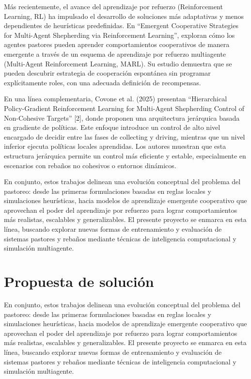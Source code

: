 \documentclass[final]{article}
\begin{document}
Más recientemente, el avance del aprendizaje por refuerzo (Reinforcement Learning, RL) ha impulsado el desarrollo de soluciones más adaptativas y menos
dependientes de heurísticas predefinidas. En “Emergent Cooperative Strategies for Multi-Agent Shepherding via Reinforcement Learning”, \citet{NapolitanoShepherding} exploran cómo los agentes pastores pueden aprender comportamientos cooperativos de manera emergente a través de un esquema de aprendizaje por refuerzo multiagente (Multi-Agent Reinforcement Learning, MARL). Su estudio demuestra que se pueden descubrir estrategia de cooperación espontánea sin programar explícitamente roles, con una adecuada definición de recompensas.

En una línea complementaria, Covone et al. (2025) presentan “Hierarchical Policy-Gradient Reinforcement Learning for Multi-Agent Shepherding Control
of Non-Cohesive Targets” [2], donde proponen una arquitectura jerárquica basada en gradiente de políticas. Este enfoque introduce un control de alto
nivel encargado de decidir entre las fases de collecting y driving, mientras que un nivel inferior ejecuta políticas locales aprendidas. Los autores
muestran que esta estructura jerárquica permite un control más eficiente y estable, especialmente en escenarios con rebaños no cohesivos o entornos dinámicos.

En conjunto, estos trabajos delinean una evolución conceptual del problema del pastoreo: desde las primeras formulaciones basadas en reglas locales y
simulaciones heurísticas, hacia modelos de aprendizaje emergente cooperativo que aprovechan el poder del aprendizaje por refuerzo para lograr
comportamientos más realistas, escalables y generalizables. El presente proyecto se enmarca en esta línea, buscando explorar nuevas formas de entrenamiento
y evaluación de sistemas pastores y rebaños mediante técnicas de inteligencia computacional y simulación multiagente.

\section{Propuesta de solución}
En conjunto, estos trabajos delinean una evolución conceptual del problema del pastoreo: desde las primeras formulaciones basadas en reglas locales y
simulaciones heurísticas, hacia modelos de aprendizaje emergente cooperativo que aprovechan el poder del aprendizaje por refuerzo para lograr
comportamientos más realistas, escalables y generalizables. El presente proyecto se enmarca en esta línea, buscando explorar nuevas formas de entrenamiento
y evaluación de sistemas pastores y rebaños mediante técnicas de inteligencia computacional y simulación multiagente.
\end{document}
